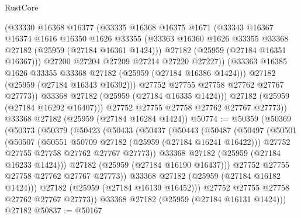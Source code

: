 \begin{lexlean}{RustCore}
\begin{coremodule}
                  (@33330
                    @16368
                    @16377
                    (@33335
                      @16368
                      @16375
                      @1671
                      (@33343
                        @16367
                        @16374
                        @1616
                        @16350
                        @1626
                        @33355
                        (@33363 @16360 @1626 @33355 @33368 @27182 (@25959 (@27184 @16361 @1424)))
                        @27182
                        (@25959 (@27184 @16351 @16367)))
                      @27200
                      @27204
                      @27209
                      @27214
                      @27220
                      @27227))
                  (@33363 @16385 @1626 @33355 @33368 @27182 (@25959 (@27184 @16386 @1424)))
                  @27182
                  (@25959 (@27184 @16343 @16392)))
                @27752
                @27755
                @27758
                @27762
                @27767
                @27773))
            @33368
            @27182
            (@25959 (@27184 @16335 @1424)))
          @27182
          (@25959 (@27184 @16292 @16407)))
        @27752
        @27755
        @27758
        @27762
        @27767
        @27773))
    @33368
    @27182
    (@25959 (@27184 @16284 @1424))
@50774 := @50359
    (@50369
      (@50373
        (@50379
          (@50423
            (@50433
              (@50437
                (@50443
                  (@50487
                    (@50497
                      (@50501
                        (@50507
                          (@50551 @50709 @27182 (@25959 (@27184 @16241 @16422)))
                          @27752
                          @27755
                          @27758
                          @27762
                          @27767
                          @27773))
                      @33368
                      @27182
                      (@25959 (@27184 @16233 @1424)))
                    @27182
                    (@25959 (@27184 @16190 @16437)))
                  @27752
                  @27755
                  @27758
                  @27762
                  @27767
                  @27773))
              @33368
              @27182
              (@25959 (@27184 @16182 @1424)))
            @27182
            (@25959 (@27184 @16139 @16452)))
          @27752
          @27755
          @27758
          @27762
          @27767
          @27773))
      @33368
      @27182
      (@25959 (@27184 @16131 @1424)))
    @27182
@50837 := @50167

\end{coremodule}
\end{lexlean}
